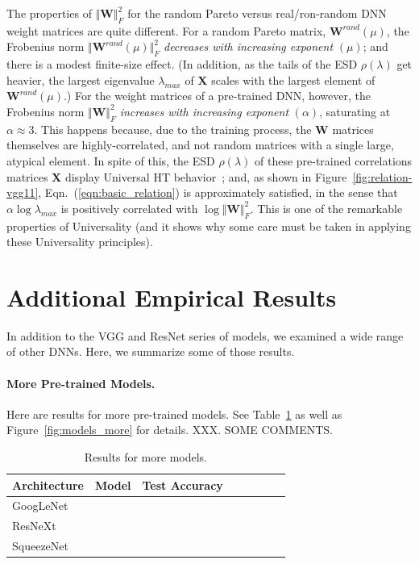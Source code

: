{The properties of $\Vert\mathbf{W}\Vert^{2}_{F}$ for the random Pareto versus real/ron-random DNN weight matrices are quite different.
For a random Pareto matrix, $\mathbf{W}^{rand}(\mu)$, the Frobenius norm $\Vert\mathbf{W}^{rand}(\mu)\Vert^{2}_{F}$ 
\emph{decreases with increasing exponent} $(\mu)$; and there is a modest finite-size effect.
(In addition, as the tails of the ESD $\rho(\lambda)$ get heavier, the largest eigenvalue $\lambda_{max}$ of $\mathbf{X}$ scales with the largest element of $\mathbf{W}^{rand}(\mu)$.) 
For the weight matrices of a pre-trained DNN, however, the Frobenius norm $\Vert\mathbf{W}\Vert^{2}_{F}$ \emph{increases with increasing exponent} $(\alpha)$, saturating at $\alpha\approx 3$.
This happens because, due to the training process, the $\mathbf{W}$ matrices themselves are highly-correlated, and not random matrices with a single large, atypical element.
In spite of this, the ESD $\rho(\lambda)$ of these pre-trained correlations matrices $\mathbf{X}$ display Universal HT behavior~\cite{MM18_TR}; and, as shown in Figure~\ref{fig:relation-vgg11}, 
Eqn.~(\ref{eqn:basic_relation}) is approximately satisfied, in the sense that 
$\alpha\log\lambda_{max}$ is positively correlated with $\log\Vert\mathbf{W}\Vert^{2}_{F} $.
This is one of the remarkable properties of Universality (and it shows why some care must be taken in applying these Universality principles).


\section{Additional Empirical Results}
\label{sxn:appendix-addl-empirical}

In addition to the VGG and ResNet series of models, we examined a wide range of other DNNs.
Here, we summarize some of those results.

\paragraph{More Pre-trained Models.}

Here are results for more pre-trained models.
See
Table~\ref{table:models_more}
as well as 
Figure~\ref{fig:models_more} 
for details.
XXX.  SOME COMMENTS.

\begin{table}[!htb]
\small
\begin{center}
\begin{tabular}{|p{1in}|c|c|c|c|c|c|c|}
\hline
Architecture 
 & Model
 & Test Accuracy \\
\hline
GoogLeNet & & \\
\hline
ResNeXt & & \\
\hline
SqueezeNet & & \\
\hline
\end{tabular}
\end{center}
\caption{Results for more models.
        }
\label{table:models_more}
\end{table}

}
